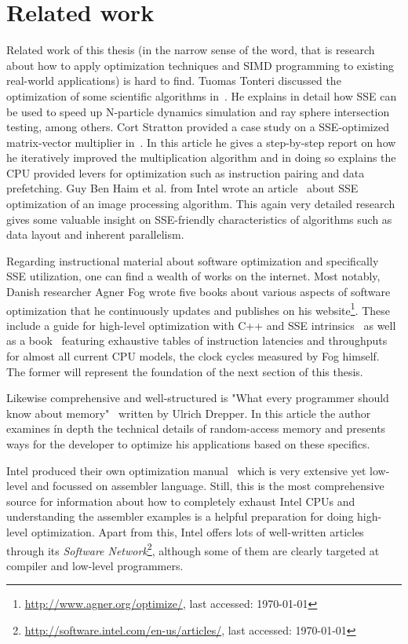 \section{Related work}
\label{Related_work}

Related work of this thesis (in the narrow sense of the word, that is research about how to apply optimization techniques and SIMD programming to existing real-world applications) is hard to find. Tuomas Tonteri discussed the optimization of some scientific algorithms in~\cite{tonteri2012}. He explains in detail how SSE can be used to speed up N-particle dynamics simulation and ray sphere intersection testing, among others. Cort Stratton provided a case study on a SSE-optimized matrix-vector multiplier in~\cite{stratton2002}. In this article he gives a step-by-step report on how he iteratively improved the multiplication algorithm and in doing so explains the CPU provided levers for optimization such as instruction pairing and data prefetching. Guy Ben Haim et al. from Intel wrote an article~\cite{haim2009} about SSE optimization of an image processing algorithm. This again very detailed research gives some valuable insight on SSE-friendly characteristics of algorithms such as data layout and inherent parallelism.

Regarding instructional material about software optimization and specifically SSE utilization, one can find a wealth of works on the internet. Most notably, Danish researcher Agner Fog wrote five books about various aspects of software optimization that he continuously updates and publishes on his website\footnote{\url{http://www.agner.org/optimize/}, last accessed: \today{}}. These include a guide for high-level optimization with C++ and SSE intrinsics~\cite{fog2011optimizing} as well as a book~\cite{fog2011instructiontables} featuring exhaustive tables of instruction latencies and throughputs for almost all current CPU models, the clock cycles measured by Fog himself. The former will represent the foundation of the next section of this thesis.

Likewise comprehensive and well-structured is "What every programmer should know about memory"~\cite{drepper2007memory} written by Ulrich Drepper. In this article the author examines ín depth the technical details of random-access memory and presents ways for the developer to optimize his applications based on these specifics.

Intel produced their own optimization manual~\cite{intel2011manual} which is very extensive yet low-level and focussed on assembler language. Still, this is the most comprehensive source for information about how to completely exhaust Intel CPUs and understanding the assembler examples is a helpful preparation for doing high-level optimization. Apart from this, Intel offers lots of well-written articles through its \emph{Software Network}\footnote{\url{http://software.intel.com/en-us/articles/}, last accessed: \today{}}, although some of them are clearly targeted at compiler and low-level programmers.

